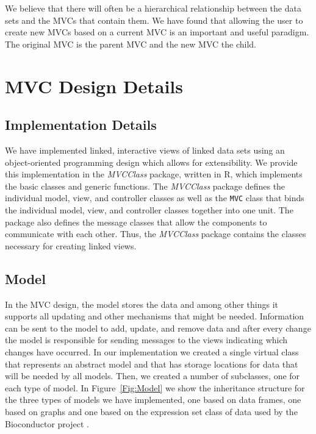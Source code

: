 \documentclass{article}[11pt]
\newcommand{\Rpackage}[1]{{\textit{#1}}}
\newcommand{\Rclass}[1]{\texttt{#1}}
\begin{document}
We believe that there will often be a hierarchical relationship
between the data sets and the MVCs that contain them. We have found
that allowing the user to create new MVCs based on a current MVC is an
important and useful paradigm.  The original MVC is the parent
MVC and the new MVC the child.

\section{MVC Design Details}
\label{Sec:OneMVC}

\subsection{Implementation Details}
\label{SSec:OneOver}

We have implemented linked, interactive views of linked data sets
using an object-oriented programming design which allows for
extensibility.  We provide this implementation in the
\Rpackage{MVCClass} package, written in R, which implements the basic
classes and generic functions.  The \Rpackage{MVCClass} package
defines the individual model, view, and controller classes as well as
the \Rclass{MVC} class that binds the individual model, view, and
controller classes together into one unit.  The package also defines
the message classes that allow the components to communicate with each
other.  Thus, the \Rpackage{MVCClass} package contains the classes
necessary for creating linked views.

\subsection{Model}
\label{Ssec:OneModel}

In the MVC design, the model stores the data and among other things it
supports all updating and other mechanisms that might be needed.
Information can be sent to the model to add, update, and remove data
and after every change the model is responsible for sending messages
to the views indicating which changes have occurred.  In our
implementation we created a single virtual class that represents an
abstract model and that has storage locations for data that will be
needed by all models. Then, we created a number of subclasses, one for
each type of model. In Figure~\ref{Fig:Model} we show the inheritance
structure for the three types of models we have implemented, one based
on data frames, one based on graphs and one based on the expression
set class of data used by the Bioconductor project \citep{BIOC}.
\end{document}
